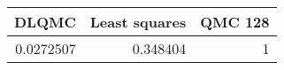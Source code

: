 \begin{tabular}{rrr}
\toprule
     DLQMC &   Least squares &   QMC 128 \\
\midrule
 0.0272507 &        0.348404 &         1 \\
\bottomrule
\end{tabular}
